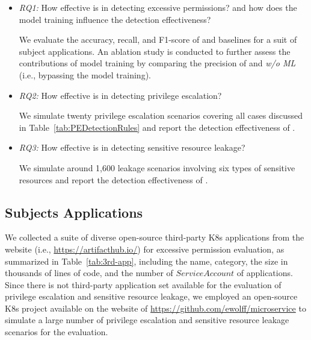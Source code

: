 \documentclass[conference]{IEEEtran}
\theoremstyle{definition}
\begin{document}
\begin{itemize}
\item \textit{RQ1:} How effective is \kg in detecting excessive permissions? and how does the model training influence the detection effectiveness?

We evaluate the accuracy, recall, and F1-score of \kg and baselines for a suit of subject applications. An ablation study is conducted to further assess the contributions of model training by comparing the precision of \kg and \textit{\kg w/o ML} (i.e., bypassing the model training). 

\item \textit{RQ2:} How effective is \kg in detecting privilege escalation? 

We simulate twenty privilege escalation scenarios covering all cases discussed in Table~\ref{tab:PEDetectionRules} and report the detection effectiveness of \kg.

\item \textit{RQ3:} How effective is \kg in detecting sensitive resource leakage?

We simulate around 1,600 leakage scenarios involving six types of sensitive resources and report the detection effectiveness of \kg.

\end{itemize}

\subsection{Subjects Applications}
We collected a suite of diverse open-source third-party K8s applications from the website (i.e., \url{https://artifacthub.io/}) for excessive permission evaluation, as summarized in Table~\ref{tab:3rd-app}, including the name, category, the size in thousands of lines of code, and the number of $ServiceAccount$ of applications.
Since there is not third-party application set available for the evaluation of privilege escalation and sensitive resource leakage, we employed an open-source K8s project available on the website of \url{ https://github.com/ewolff/microservice} to simulate a large number of privilege escalation and sensitive resource leakage scenarios for the evaluation.
\end{document}
